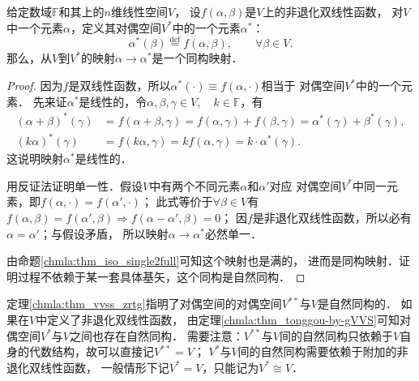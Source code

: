 \begin{theorem}\label{chmla:thm_tonggou-by-gVVS}
    给定数域$\mathbb{F}$和其上的$n$维线性空间$V$，
    设$f(\alpha,\beta)$是$V$上的非退化双线性函数，
    对$V$中一个元素$\alpha$，定义其对偶空间$V^{*}$中的一个元素$\alpha^*$：
    \begin{equation}
        \alpha^{*}(\beta) \overset{\mathrm {def}}{=} f(\alpha,\beta),
        \qquad \forall \beta \in V.
    \end{equation}
    那么，从$V$到$V^*$的映射$\alpha \to \alpha^*$是一个同构映射．
\end{theorem}
\begin{proof}
    因为$f$是双线性函数，所以$\alpha^*(\cdot) \equiv f(\alpha,\cdot)$相当于
    对偶空间$V^*$中的一个元素．
    先来证$\alpha^*$是线性的，令$\alpha,\beta,\gamma \in V, \quad k\in \mathbb{F}$，有
    \begin{align*}
        (\alpha+\beta)^*(\gamma)&=f(\alpha+\beta,\gamma)
        =f(\alpha,\gamma)+f(\beta,\gamma)
        =\alpha^{*}(\gamma)+ \beta^{*}(\gamma), \\
        (k \alpha)^* (\gamma)&=f(k \alpha,\gamma) =kf(\alpha,\gamma)=k\cdot \alpha^*(\gamma) .
    \end{align*}
    这说明映射$\alpha^*$是线性的．

    用反证法证明单一性．假设$V$中有两个不同元素$\alpha$和$\alpha'$对应
    对偶空间$V^*$中同一元素，即$f(\alpha,\cdot)=f(\alpha',\cdot)$；
    此式等价于$\forall \beta \in V$有
    $f(\alpha,\beta)=f(\alpha',\beta)\Rightarrow f(\alpha-\alpha',\beta)=0$；
    因$f$是非退化双线性函数，所以必有$\alpha=\alpha'$；与假设矛盾，
    所以映射$\alpha \to \alpha^*$必然单一．

    由命题\ref{chmla:thm_iso_single2full}可知这个映射也是满的，
    进而是同构映射．证明过程不依赖于某一套具体基矢，这个同构是{\heiti 自然同构}．
\end{proof}
\begin{remark}
    定理\ref{chmla:thm_vvss_zrtg}指明了对偶空间的对偶空间$V^{**}$与$V$是自然同构的．
    如果在$V$中定义了非退化双线性函数，
    由定理\ref{chmla:thm_tonggou-by-gVVS}可知对偶空间$V^{*}$与$V$之间也存在自然同构．
    需要注意：$V^{**}$与$V$间的自然同构只依赖于$V$自身的代数结构，故可以直接记$V^{**}=V$；
    $V^{*}$与$V$间的自然同构需要依赖于附加的非退化双线性函数，
    一般情形下记$V^{*}=V$，只能记为$V^{*} \cong V$．
\end{remark}



